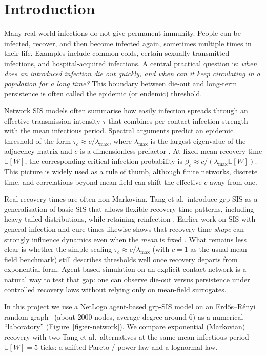 \documentclass[11pt,a4paper]{article}
\begin{document}
\section{Introduction}
\label{sec:introduction}

Many real-world infections do not give permanent immunity. People can be infected, recover, and then become infected again, sometimes multiple times in their life. Examples include common colds, certain sexually transmitted infections, and hospital-acquired infections. A central practical question is: \emph{when does an introduced infection die out quickly, and when can it keep circulating in a population for a long time?} This boundary between die-out and long-term persistence is often called the epidemic (or endemic) threshold.

Network SIS models often summarise how easily infection spreads through an effective transmission intensity $\tau$ that combines per-contact infection strength with the mean infectious period. Spectral arguments predict an epidemic threshold of the form $\tau_c \approx c/\lambda_{\max}$, where $\lambda_{\max}$ is the largest eigenvalue of the adjacency matrix and $c$ is a dimensionless prefactor \cite{Chakrabarti2008,VanMieghem2011,PastorSatorras2015}. At fixed mean recovery time $\mathbb{E}[W]$, the corresponding critical infection probability is $\beta_c \approx c/(\lambda_{\max}\mathbb{E}[W])$. This picture is widely used as a rule of thumb, although finite networks, discrete time, and correlations beyond mean field can shift the effective $c$ away from one.

Real recovery times are often non-Markovian. Tang et al.\ introduce grp-SIS as a generalisation of basic SIS that allows flexible recovery-time patterns, including heavy-tailed distributions, while retaining reinfection \cite{Tang2025}. Earlier work on SIS with general infection and cure times likewise shows that recovery-time \emph{shape} can strongly influence dynamics even when the \emph{mean} is fixed \cite{Cator2013}. What remains less clear is whether the simple scaling $\tau_c \approx c/\lambda_{\max}$ (with $c{=}1$ as the usual mean-field benchmark) still describes thresholds well once recovery departs from exponential form. Agent-based simulation on an explicit contact network is a natural way to test that gap: one can observe die-out versus persistence under controlled recovery laws without relying only on mean-field surrogates.

In this project we use a NetLogo agent-based grp-SIS model on an Erd\H{o}s--R\'enyi random graph~\cite{ErdosRenyi1959} (about 2000 nodes, average degree around 6) as a numerical ``laboratory'' (Figure~\ref{fig:er-network}). We compare exponential (Markovian) recovery with two Tang et al.\ alternatives at the same mean infectious period $\mathbb{E}[W]{=}5$ ticks: a shifted Pareto / power law and a lognormal law.
\end{document}

